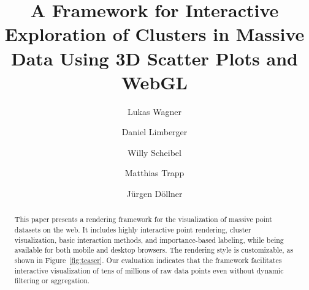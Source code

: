 \documentclass[sigconf]{acmart}
\begin{document}
\title{A Framework for Interactive Exploration of Clusters in Massive Data Using 3D Scatter Plots and WebGL}

\author{Lukas Wagner}

\author{Daniel Limberger}

\author{Willy Scheibel}

\author{Matthias Trapp}

\author{J{\"u}rgen D{\"o}llner}

\renewcommand{\shortauthors}{Wagner et al.}

\begin{abstract}
This paper presents a rendering framework for the visualization of massive point datasets on the web.
It includes highly interactive point rendering, cluster visualization, basic interaction methods, and importance-based labeling, while being available for both mobile and desktop browsers.
The rendering style is customizable, as shown in Figure~\ref{fig:teaser}.
Our evaluation indicates that the framework facilitates interactive visualization of tens of millions of raw data points even without dynamic filtering or aggregation.
\end{abstract}

\end{document}
